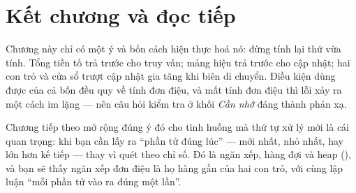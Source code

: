 \documentclass[../../algorithm.tex]{subfiles}
\begin{document}
\section*{Kết chương và đọc tiếp}

Chương này chỉ có một ý và bốn cách hiện thực hoá nó: đừng tính lại thứ vừa tính. Tổng tiền tố trả trước cho truy vấn; mảng hiệu trả trước cho cập nhật; hai con trỏ và cửa sổ trượt cập nhật gia tăng khi biên di chuyển. Điều kiện dùng được của cả bốn đều quy về tính đơn điệu, và mất tính đơn điệu thì lỗi xảy ra một cách im lặng --- nên câu hỏi kiểm tra ở khối \emph{Cần nhớ} đáng thành phản xạ.

Chương tiếp theo mở rộng đúng ý đó cho tình huống mà thứ tự xử lý mới là cái quan trọng: khi bạn cần lấy ra ``phần tử đúng lúc'' --- mới nhất, nhỏ nhất, hay lớn hơn kế tiếp --- thay vì quét theo chỉ số. Đó là ngăn xếp, hàng đợi và heap (), và bạn sẽ thấy ngăn xếp đơn điệu là họ hàng gần của hai con trỏ, với cùng lập luận ``mỗi phần tử vào ra đúng một lần''.
\ifSubfilesClassLoaded{\printbibliography[title={Nguồn}]}{}
\end{document}
